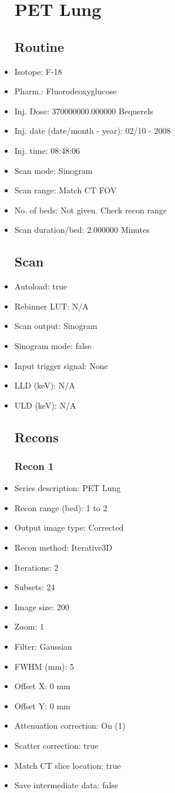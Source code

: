 \documentclass[12pt]{article}
\begin{document}
\begin{itemize}
\section{PET Lung}\subsection{Routine}
\item Isotope: F-18
\item Pharm.: Fluorodeoxyglucose
\item Inj. Dose: 370000000.000000 Bequerels
\item Inj. date (date/month - year): 02/10 - 2008
\item Inj. time: 08:48:06
\item Scan mode: Sinogram
\item Scan range: Match CT FOV
\item No. of beds: Not given. Check recon range
\item Scan duration/bed: 2.000000 Minutes
\subsection{Scan}
\item Autoload: true
\item Rebinner LUT: N/A
\item Scan output: Sinogram
\item Sinogram mode: false
\item Input trigger signal: None
\item LLD (keV): N/A
\item ULD (keV): N/A
\subsection{Recons}
\subsubsection{Recon 1}
\item Series description: PET Lung
\item Recon range (bed): 1 to 2
\item Output image type: Corrected
\item Recon method: Iterative3D
\item Iterations: 2
\item Subsets: 24
\item Image size: 200
\item Zoom: 1
\item Filter: Gaussian
\item FWHM (mm): 5
\item Offset X: 0 mm
\item Offset Y: 0 mm
\item Attenuation correction: On (1)
\item Scatter correction: true
\item Match CT slice location: true
\item Save intermediate data: false
\end{itemize}
\end{document}
